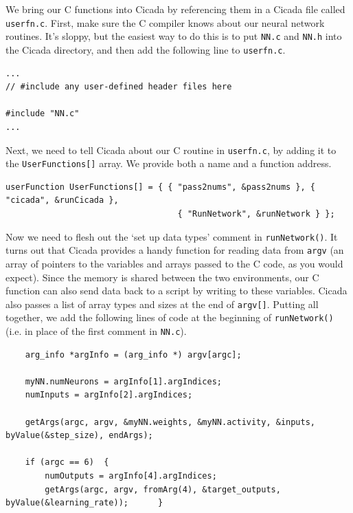 \documentclass{article}
\newenvironment{code}{
       \begin{list}{}{
               \setlength{\leftmargin}{.4in}
               \setlength{\rightmargin}{0in}
               \setlength{\topsep}{.2in}
       }
       \small
       \item[] }
       { \end{list}   }
\begin{document}
We bring our C functions into Cicada by referencing them in a Cicada file called \verb#userfn.c#.  First, make sure the C compiler knows about our neural network routines.  It's sloppy, but the easiest way to do this is to put \verb#NN.c# and \verb#NN.h# into the Cicada directory, and then add the following line to \verb#userfn.c#.

\begin{code} \begin{verbatim}
...
// #include any user-defined header files here

#include "NN.c"
...
\end{verbatim} \end{code}

\noindent Next, we need to tell Cicada about our C routine in \verb#userfn.c#, by adding it to the \verb#UserFunctions[]# array.  We provide both a name and a function address.

\begin{code} \begin{verbatim}
userFunction UserFunctions[] = { { "pass2nums", &pass2nums }, { "cicada", &runCicada },
                                   { "RunNetwork", &runNetwork } };
\end{verbatim} \end{code}

Now we need to flesh out the `set up data types' comment in \verb#runNetwork()#.  It turns out that Cicada provides a handy function for reading data from \verb#argv# (an array of pointers to the variables and arrays passed to the C code, as you would expect).  Since the memory is shared between the two environments, our C function can also send data back to a script by writing to these variables.  Cicada also passes a list of array types and sizes at the end of \verb#argv[]#.  Putting all together, we add the following lines of code at the beginning of \verb#runNetwork()# (i.e. in place of the first comment in \verb#NN.c#).


\begin{code} \begin{verbatim}
    arg_info *argInfo = (arg_info *) argv[argc];
    
    myNN.numNeurons = argInfo[1].argIndices;
    numInputs = argInfo[2].argIndices;
    
    getArgs(argc, argv, &myNN.weights, &myNN.activity, &inputs, byValue(&step_size), endArgs);
    
    if (argc == 6)  {
        numOutputs = argInfo[4].argIndices;
        getArgs(argc, argv, fromArg(4), &target_outputs, byValue(&learning_rate));      }
\end{verbatim} \end{code}
\end{document}
